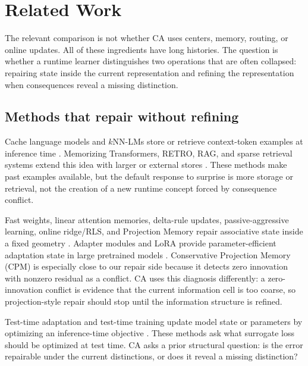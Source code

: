 \section{Related Work}
\label{app:related}

The relevant comparison is not whether CA uses centers, memory, routing, or online updates. All of these ingredients have long histories. The question is whether a runtime learner distinguishes two operations that are often collapsed: repairing state inside the current representation and refining the representation when consequences reveal a missing distinction.

\subsection{Methods that repair without refining}

Cache language models and $k$NN-LMs store or retrieve context-token examples at inference time \citep{grave2017improving,khandelwal2020generalization}. Memorizing Transformers, RETRO, RAG, and sparse retrieval systems extend this idea with larger or external stores \citep{wu2022memorizing,borgeaud2022improving,lewis2020retrieval,rae2016scaling}. These methods make past examples available, but the default response to surprise is more storage or retrieval, not the creation of a new runtime concept forced by consequence conflict.

Fast weights, linear attention memories, delta-rule updates, passive-aggressive learning, online ridge/RLS, and Projection Memory repair associative state inside a fixed geometry \citep{ba2016using,katharopoulos2020transformers,schlag2021linear,crammer2006online,vovk1997competitive,bregman1967relaxation,tikhonov1977solutions,hoerl1970ridge}. Adapter modules and LoRA provide parameter-efficient adaptation state in large pretrained models \citep{houlsby2019parameter,hu2022lora}. Conservative Projection Memory (CPM) is especially close to our repair side because it detects zero innovation with nonzero residual as a conflict. CA uses this diagnosis differently: a zero-innovation conflict is evidence that the current information cell is too coarse, so projection-style repair should stop until the information structure is refined.

Test-time adaptation and test-time training update model state or parameters by optimizing an inference-time objective \citep{sun2020test,wang2021tent,niu2022eata,zhang2022memo,sun2025learning}. These methods ask what surrogate loss should be optimized at test time. CA asks a prior structural question: is the error repairable under the current distinctions, or does it reveal a missing distinction?

